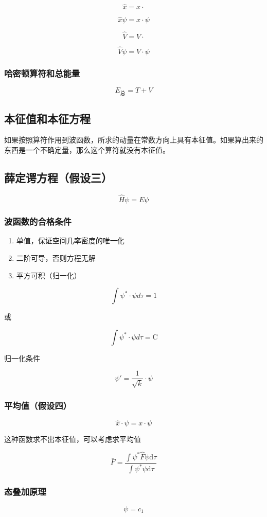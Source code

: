 \documentclass[a4paper]{ctexrep}
\renewcommand{\d}{\mathrm{d}}
\begin{document}
    \[
        \hat{x} = x \cdot  
    \]

    \[
        \hat{x} \psi = x \cdot \psi  
    \]

    \[
        \hat{V} = V \cdot   
    \]

    \[
        \hat{V} \psi = V \cdot \psi  
    \]


    \subsubsection{哈密顿算符和总能量}

    \[
        E_{\mbox{总}} = T + V  
    \]

    \subsection{本征值和本征方程}

    如果按照算符作用到波函数，所求的动量在常数方向上具有本征值。如果算出来的东西是一个不确定量，那么这个算符就没有本征值。

    \subsection{薛定谔方程（假设三）}
    
    \[
        \hat{H} \psi = E \psi  
    \]

    \subsubsection{波函数的合格条件}

    \begin{enumerate}
        \item 单值，保证空间几率密度的唯一化
        \item 二阶可导，否则方程无解
        \item 平方可积（归一化）
    \end{enumerate}

    \[
        \int \psi^{*} \cdot \psi d\tau = 1  
    \]

    或

    \[
        \int \psi^{*} \cdot \psi d\tau = \mathrm{C} 
    \]

    归一化条件

    \[
        \psi' = \frac{1}{\sqrt{k}} \cdot \psi  
    \]

    \subsubsection{平均值（假设四）}

    \[
        \hat{x} \cdot \psi = x \cdot \psi  
    \]

    这种函数求不出本征值，可以考虑求平均值

    \[
        \bar{F} = \frac{\int \psi^* \hat{F} \psi \d \tau}{\int \psi^* \psi \d \tau}
    \]

    \subsubsection{态叠加原理}

    \[
        \psi = c_1   
    \]
\end{document}
